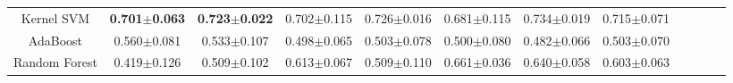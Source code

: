 \documentclass{article}
\theoremstyle{plain}
\begin{document}
\begin{table*}
\begin{center}
{\begin{tabular}{*{12}{c}}
\cmidrule(lr){1-1}
\cmidrule(lr){2-2}
\cmidrule(lr){3-3}
\cmidrule(lr){4-4}
\cmidrule(lr){5-5}
\cmidrule(lr){6-6}
\cmidrule(lr){7-7}
\cmidrule(lr){8-8}
Kernel SVM&\textbf{0.701$\pm$0.063}&\textbf{0.723$\pm$0.022}&0.702$\pm$0.115&0.726$\pm$0.016&0.681$\pm$0.115&0.734$\pm$0.019&0.715$\pm$0.071\\


\cmidrule(lr){1-1}
\cmidrule(lr){2-2}
\cmidrule(lr){3-3}
\cmidrule(lr){4-4}
\cmidrule(lr){5-5}
\cmidrule(lr){6-6}
\cmidrule(lr){7-7}
\cmidrule(lr){8-8}
AdaBoost&0.560$\pm$0.081&0.533$\pm$0.107&0.498$\pm$0.065&0.503$\pm$0.078&0.500$\pm$0.080&0.482$\pm$0.066&0.503$\pm$0.070\\



\cmidrule(lr){1-1}
\cmidrule(lr){2-2}
\cmidrule(lr){3-3}
\cmidrule(lr){4-4}
\cmidrule(lr){5-5}
\cmidrule(lr){6-6}
\cmidrule(lr){7-7}
\cmidrule(lr){8-8}
Random Forest&0.419$\pm$0.126&0.509$\pm$0.102&0.613$\pm$0.067&0.509$\pm$0.110&0.661$\pm$0.036&0.640$\pm$0.058&0.603$\pm$0.063\\



\bottomrule

\end{tabular}
}
\end{center}
\label{tab:main-result}
\end{table*}
\end{document}
